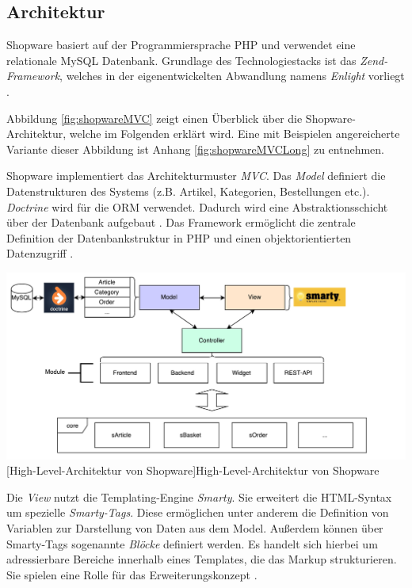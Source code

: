 \documentclass[11pt, a4paper, titlepage, listof=totoc, bibliography=totoc, index=totoc, twoside, openright, headings=normal]{scrreprt}
\begin{document}
\subsection{Architektur}
\label{shopwareArchitektur}
Shopware basiert auf der Programmiersprache PHP und verwendet eine relationale MySQL Datenbank. Grundlage des Technologiestacks ist das \emph{Zend-Framework}, welches in der eigenentwickelten Abwandlung namens \emph{Enlight} vorliegt \citep{shopware5Docs}.

Abbildung \ref{fig:shopwareMVC} zeigt einen Überblick über die Shopware-Architektur, welche im Folgenden erklärt wird. Eine mit Beispielen angereicherte Variante dieser Abbildung ist Anhang \ref{fig:shopwareMVCLong} zu entnehmen.

Shopware implementiert das Architekturmuster \emph{\ac{MVC}}. Das \emph{Model} definiert die Datenstrukturen des Systems (z.B. Artikel, Kategorien, Bestellungen etc.). \emph{Doctrine} wird für die \ac{ORM} verwendet. Dadurch wird eine Abstraktionsschicht über der Datenbank aufgebaut \citep{shopware5Docs}. Das Framework ermöglicht die zentrale Definition der Datenbankstruktur in PHP und einen objektorientierten Datenzugriff \citep{shopware4Docs}.

\vspace{1em}
\begin{minipage}{\linewidth}
	\centering
	\includegraphics[width=1\linewidth]{Abbildungen/shopwareMVCShort.pdf}
	[High-Level-Architektur von Shopware]{High-Level-Architektur von Shopware}
	\label{fig:shopwareMVC}
\end{minipage}
\vspace{0.3em}

Die \emph{View} nutzt die Templating-Engine \emph{Smarty}. Sie erweitert die HTML-Syntax um spezielle \emph{Smarty-Tags}. Diese ermöglichen unter anderem die Definition von Variablen zur Darstellung von Daten aus dem Model. Außerdem können über Smarty-Tags sogenannte \emph{Blöcke} definiert werden. Es handelt sich hierbei um adressierbare Bereiche innerhalb eines Templates, die das Markup strukturieren. Sie spielen eine Rolle für das Erweiterungskonzept \citep{shopware5Docs}.
\end{document}
